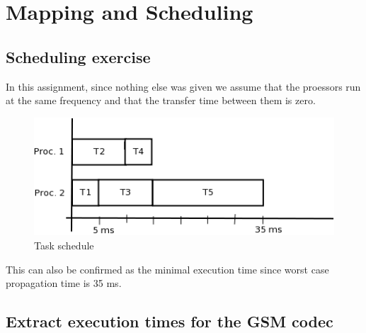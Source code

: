\documentclass[a4paper, 12pt]{article}
\begin{document}
\section{Mapping and Scheduling}
\subsection{Scheduling exercise}
In this assignment, since nothing else was given we assume that the
proessors run at the same frequency and that the transfer time between
them is zero.
\begin{figure}[h]
  \centering
  \includegraphics{taskSchedule.png}
  \caption{Task schedule}
  \label{fig:schedule}
\end{figure}
 This can also be confirmed as the minimal execution time since worst
 case propagation time is 35 ms. 

\subsection{Extract execution times for the GSM codec}
\end{document}
